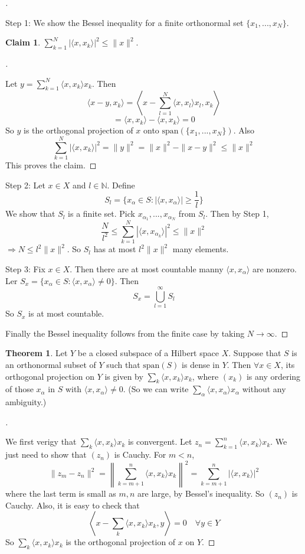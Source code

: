 \documentclass{article}
\theoremstyle{definition}
\newtheorem{thm}{Theorem}
\newtheorem*{clm}{Claim}
\newenvironment{proofs}[1][\proofname]{%
  \begin{proof}[#1]$ $\par\nobreak\ignorespaces
}{%
  \end{proof}
}
\begin{document}
\begin{proofs}
	Step 1: We show the Bessel inequality for a finite orthonormal set $\{x_1, ..., x_N\}$. 
	\begin{clm}
		$\sum_{k = 1}^N |\langle x, x_k \rangle|^2 \leq \|x\|^2$.
	\end{clm}

	\begin{proofs}
		Let $y = \sum_{k = 1}^N \langle x, x_k \rangle x_k$.
		Then 
		\[
			\langle x - y, x_k \rangle = \left\langle x - \sum_{l = 1}^N \langle x, x_l \rangle x_l, x_k \right\rangle
		\]
		\[
			= \langle x, x_k \rangle - \langle x, x_k \rangle = 0
		\]
		So $y$ is the orthogonal projection of $x$ onto $\text{span}(\{x_1, ..., x_N\})$.
		Also 
		\[
			\sum_{k = 1}^N |\langle x, x_k \rangle|^2 = \|y\|^2 = \|x\|^2 - \|x - y\|^2 \leq \|x\|^2
		\]
		This proves the claim.
	\end{proofs}
	
	Step 2: Let $x \in X$ and $l \in \mathbb{N}$. 
	Define 
	\[
		S_l = \{x_\alpha \in S: |\langle x, x_\alpha \rangle | \geq \frac{1}{l}\}
	\]
	We show that $S_l$ is a finite set.
	Pick $x_{\alpha_1}, ..., x_{\alpha_N}$ from $S_l$.
	Then by Step 1,
	\[
		\frac{N}{l^2} \leq \sum_{k = 1}^N |\langle x, x_{\alpha_k} \rangle |^2 \leq \|x\|^2
	\]
	$\Rightarrow N \leq l^2 \|x\|^2$.
	So $S_l$ has at most $l^2 \|x\|^2$ many elements.

	\par Step 3: Fix $x \in X$.
	Then there are at most countable manny $\langle x, x_\alpha \rangle$ are nonzero.
	Ler $S_x = \{x_\alpha \in S: \langle x, x_\alpha \rangle \neq 0\}$.
	Then
	\[
		S_x = \bigcup_{l = 1}^\infty S_l
	\]
	So $S_x$ is at most countable.\\
	\par Finally the Bessel inequality follows from the finite case by taking $N \to \infty$.
\end{proofs}

\begin{thm}
	Let $Y$ be a closed subspace of a Hilbert space $X$.
	Suppose that $S$ is an orthonormal subset of $Y$ such that $\text{span}(S)$ is dense in $Y$.
	Then $\forall x \in X$, its orthogonal projection on $Y$ is given by $\sum_k \langle x, x_k \rangle x_k$, where $(x_k)$ is any ordering of those $x_\alpha$ in $S$ with $\langle x, x_\alpha \rangle \neq 0$.
	(So we can write $\sum_\alpha \langle x, x_\alpha \rangle x_\alpha$ without any ambiguity.)
\end{thm}

\begin{proofs}
	We first verigy that $\sum_k \langle x, x_k \rangle x_k$ is convergent.
	Let $z_n = \sum_{k = 1}^n \langle x, x_k \rangle x_k$.
	We just need to show that $(z_n)$ is Cauchy.
	For $m < n$, 
	\[
		\|z_m - z_n\|^2 = \left\|\sum_{k = m + 1}^n \langle x, x_k \rangle x_k \right\|^2 = \sum_{k = m + 1}^n |\langle x, x_k \rangle|^2
	\]
	where the last term is small as $m, n$ are large, by Bessel's inequality.
	So $(z_n)$ is Cauchy.
	Also, it is easy to check that 
	\[
		\left\langle x - \sum_k \langle x, x_k \rangle x_k, y \right\rangle = 0 \quad \forall y \in Y
	\]
	So $\sum_k \langle x, x_k \rangle x_k$ is the orthogonal projection of $x$ on $Y$.
\end{proofs}
\end{document}
